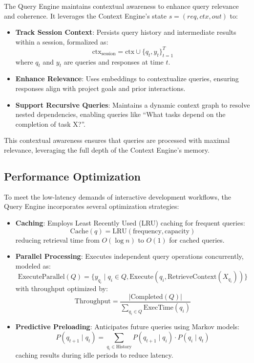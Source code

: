 \documentclass[11pt]{article}
\begin{document}
The Query Engine maintains contextual awareness to enhance query relevance and coherence. It leverages the Context Engine’s state \( s = (req, ctx, out) \) to:
\begin{itemize}
    \item \textbf{Track Session Context}: Persists query history and intermediate results within a session, formalized as:
        \[
        \text{ctx}_{\text{session}} = \text{ctx} \cup \{ q_t, y_t \}_{t=1}^T
        \]
        where \( q_t \) and \( y_t \) are queries and responses at time \( t \).
    \item \textbf{Enhance Relevance}: Uses embeddings to contextualize queries, ensuring responses align with project goals and prior interactions.
    \item \textbf{Support Recursive Queries}: Maintains a dynamic context graph to resolve nested dependencies, enabling queries like “What tasks depend on the completion of task X?”.
\end{itemize}

This contextual awareness ensures that queries are processed with maximal relevance, leveraging the full depth of the Context Engine’s memory.

\subsection{Performance Optimization}
\label{subsec:performance_optimization}

To meet the low-latency demands of interactive development workflows, the Query Engine incorporates several optimization strategies:
\begin{itemize}
    \item \textbf{Caching}: Employs Least Recently Used (LRU) caching for frequent queries:
        \[
        \text{Cache}(q) = \text{LRU}(\text{frequency}, \text{capacity})
        \]
        reducing retrieval time from \( O(\log n) \) to \( O(1) \) for cached queries.
    \item \textbf{Parallel Processing}: Executes independent query operations concurrently, modeled as:
        \[
        \text{ExecuteParallel}(Q) = \{ y_{q_i} \mid q_i \in Q, \text{Execute}(q_i, \text{RetrieveContext}(X_{q_i})) \}
        \]
        with throughput optimized by:
        \[
        \text{Throughput} = \frac{|\text{Completed}(Q)|}{\sum_{q_i \in Q} \text{ExecTime}(q_i)}
        \]
    \item \textbf{Predictive Preloading}: Anticipates future queries using Markov models:
        \[
        P(q_{t+1} \mid q_t) = \sum_{q_i \in \text{History}} P(q_{t+1} \mid q_i) \cdot P(q_i \mid q_t)
        \]
        caching results during idle periods to reduce latency.
\end{itemize}
\end{document}
